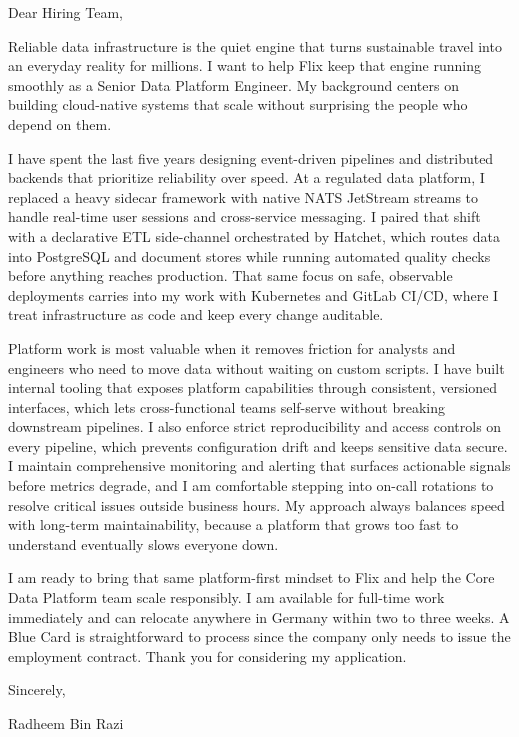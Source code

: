 \documentclass[11pt,a4paper]{coverletter}
\begin{document}

\opening{Dear Hiring Team,}

Reliable data infrastructure is the quiet engine that turns sustainable travel into an everyday reality for millions. I want to help Flix keep that engine running smoothly as a Senior Data Platform Engineer. My background centers on building cloud-native systems that scale without surprising the people who depend on them.

I have spent the last five years designing event-driven pipelines and distributed backends that prioritize reliability over speed. At a regulated data platform, I replaced a heavy sidecar framework with native NATS JetStream streams to handle real-time user sessions and cross-service messaging. I paired that shift with a declarative ETL side-channel orchestrated by Hatchet, which routes data into PostgreSQL and document stores while running automated quality checks before anything reaches production. That same focus on safe, observable deployments carries into my work with Kubernetes and GitLab CI/CD, where I treat infrastructure as code and keep every change auditable.

Platform work is most valuable when it removes friction for analysts and engineers who need to move data without waiting on custom scripts. I have built internal tooling that exposes platform capabilities through consistent, versioned interfaces, which lets cross-functional teams self-serve without breaking downstream pipelines. I also enforce strict reproducibility and access controls on every pipeline, which prevents configuration drift and keeps sensitive data secure. I maintain comprehensive monitoring and alerting that surfaces actionable signals before metrics degrade, and I am comfortable stepping into on-call rotations to resolve critical issues outside business hours. My approach always balances speed with long-term maintainability, because a platform that grows too fast to understand eventually slows everyone down.

I am ready to bring that same platform-first mindset to Flix and help the Core Data Platform team scale responsibly. I am available for full-time work immediately and can relocate anywhere in Germany within two to three weeks. A Blue Card is straightforward to process since the company only needs to issue the employment contract. Thank you for considering my application.

\closing{Sincerely,}{Radheem Bin Razi}
\end{document}
